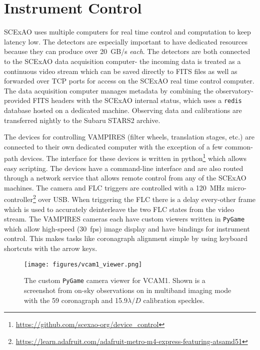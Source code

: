 \section{Instrument Control}\label{sec:control}

SCExAO uses multiple computers for real time control and computation to keep latency low. The detectors are especially important to have dedicated resources because they can produce over \SI{20}{GB/s} \textit{each}. The detectors are both connected to the SCExAO data acquisition computer- the incoming data is treated as a continuous video stream which can be saved directly to FITS files as well as forwarded over TCP ports for access on the SCExAO real time control computer. The data acquisition computer manages metadata by combining the observatory-provided FITS headers with the SCExAO internal status, which uses a \texttt{redis} database hosted on a dedicated machine. Observing data and calibrations are transferred nightly to the Subaru STARS2 archive.

The devices for controlling VAMPIRES (filter wheels, translation stages, etc.) are connected to their own dedicated computer with the exception of a few common-path devices. The interface for these devices is written in python\footnote{\url{https://github.com/scexao-org/device_control}} which allows easy scripting. The devices have a command-line interface and are also routed through a network service that allows remote control from any of the SCExAO machines. The camera and FLC triggers are controlled with a \SI{120}{\mega\hertz} micro-controller\footnote{\url{https://learn.adafruit.com/adafruit-metro-m4-express-featuring-atsamd51}} over USB. When triggering the FLC there is a delay every-other frame which is used to accurately deinterleave the two FLC states from the video stream. The VAMPIRES cameras each have custom viewers written in \texttt{PyGame} which allow high-speed (\SI{30}{fps}) image display and have bindings for instrument control. This makes tasks like coronagraph alignment simple by using keyboard shortcuts with the arrow keys.

\begin{figure}
    \centering
    \texttt{[image: figures/vcam1\_viewer.png]}
    \caption{The custom \texttt{PyGame} camera viewer for VCAM1. Shown is a screenshot from on-sky observations on  in multiband imaging mode with the \SI{59}{\mas} coronagraph and 15.9$\lambda/D$ calibration speckles.}
    \label{fig:vcam1}
\end{figure}

